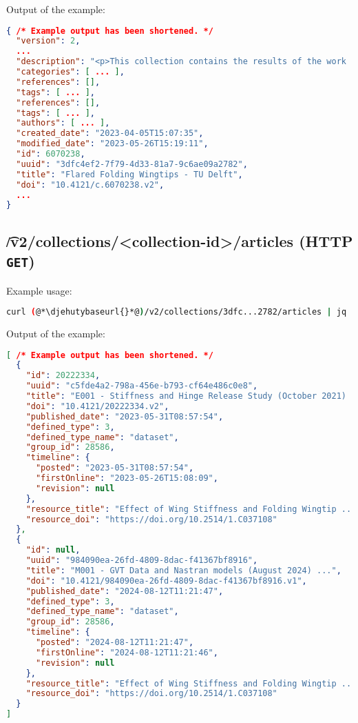   Output of the example:
\begin{lstlisting}[language=JSON]
{ /* Example output has been shortened. */
  "version": 2,
  ...
  "description": "<p>This collection contains the results of the work ...",
  "categories": [ ... ],
  "references": [],
  "tags": [ ... ],
  "references": [],
  "tags": [ ... ],
  "authors": [ ... ],
  "created_date": "2023-04-05T15:07:35",
  "modified_date": "2023-05-26T15:19:11",
  "id": 6070238,
  "uuid": "3dfc4ef2-7f79-4d33-81a7-9c6ae09a2782",
  "title": "Flared Folding Wingtips - TU Delft",
  "doi": "10.4121/c.6070238.v2",
  ...
}
\end{lstlisting}

\subsection{\t{/v2/collections/<collection-id>/articles} (HTTP \texttt{GET})}

  Example usage:
\begin{lstlisting}[language=bash]
curl (@*\djehutybaseurl{}*@)/v2/collections/3dfc...2782/articles | jq
\end{lstlisting}

  Output of the example:
\begin{lstlisting}[language=JSON]
[ /* Example output has been shortened. */
  {
    "id": 20222334,
    "uuid": "c5fde4a2-798a-456e-b793-cf64e486c0e8",
    "title": "E001 - Stiffness and Hinge Release Study (October 2021) ...",
    "doi": "10.4121/20222334.v2",
    "published_date": "2023-05-31T08:57:54",
    "defined_type": 3,
    "defined_type_name": "dataset",
    "group_id": 28586,
    "timeline": {
      "posted": "2023-05-31T08:57:54",
      "firstOnline": "2023-05-26T15:08:09",
      "revision": null
    },
    "resource_title": "Effect of Wing Stiffness and Folding Wingtip ...",
    "resource_doi": "https://doi.org/10.2514/1.C037108"
  },
  {
    "id": null,
    "uuid": "984090ea-26fd-4809-8dac-f41367bf8916",
    "title": "M001 - GVT Data and Nastran models (August 2024) ...",
    "doi": "10.4121/984090ea-26fd-4809-8dac-f41367bf8916.v1",
    "published_date": "2024-08-12T11:21:47",
    "defined_type": 3,
    "defined_type_name": "dataset",
    "group_id": 28586,
    "timeline": {
      "posted": "2024-08-12T11:21:47",
      "firstOnline": "2024-08-12T11:21:46",
      "revision": null
    },
    "resource_title": "Effect of Wing Stiffness and Folding Wingtip ...",
    "resource_doi": "https://doi.org/10.2514/1.C037108"
  }
]
\end{lstlisting}

